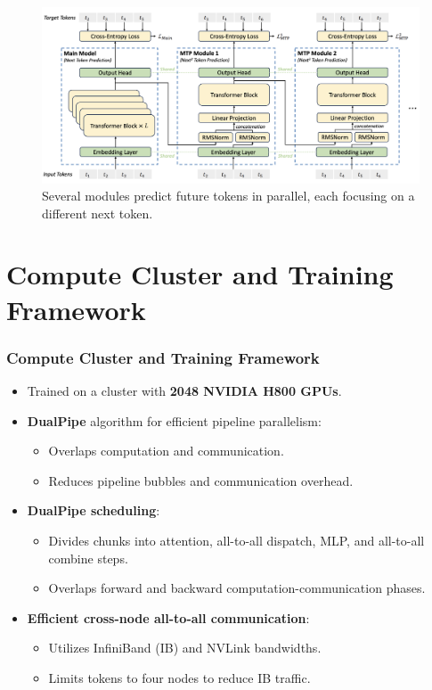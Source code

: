 \documentclass{beamer}
\begin{document}
\begin{frame}
    \begin{figure}[htbp]
        \centering
        \includegraphics[scale=0.28168]{attachments/multi-token-prediction.png}
        \caption{Several modules predict future tokens in parallel, each focusing on a different next token.}
    \end{figure}
\end{frame}

\section{Compute Cluster and Training Framework}

\begin{frame}
    \frametitle{Compute Cluster and Training Framework}
    \begin{itemize}
        \item Trained on a cluster with \textbf{2048 NVIDIA H800 GPUs}.
        \item \textbf{DualPipe} algorithm for efficient pipeline parallelism:
              \begin{itemize}
                  \item Overlaps computation and communication.
                  \item Reduces pipeline bubbles and communication overhead.
              \end{itemize}
        \item \textbf{DualPipe scheduling}:
              \begin{itemize}
                  \item Divides chunks into attention, all-to-all dispatch, MLP, and all-to-all combine steps.
                  \item Overlaps forward and backward computation-communication phases.
              \end{itemize}
        \item \textbf{Efficient cross-node all-to-all communication}:
              \begin{itemize}
                  \item Utilizes InfiniBand (IB) and NVLink bandwidths.
                  \item Limits tokens to four nodes to reduce IB traffic.
              \end{itemize}
    \end{itemize}
\end{frame}
\end{document}

